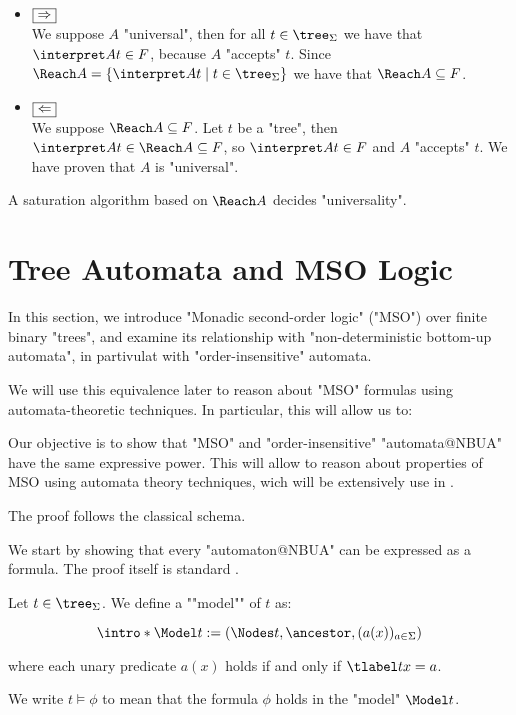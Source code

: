 \documentclass[a4paper,UKenglish,cleveref, autoref, thm-restate]{lipics-v2021}
\begin{document}
\begin{proofI}
	\begin{itemize}
		\item $\fbox{$\Rightarrow$}$\\
		      We suppose $A$ "universal", then for all $t \in \tree_\Sigma$ we have that $\interpret A t \in F$, because $A$ "accepts" $t$.
		      Since $\Reach A = \setdef {\interpret A t} {t\in \tree_\Sigma}$ we have that $\Reach A \subseteq F$.

		\item $\fbox{$\Leftarrow$}$\\
		      We suppose $\Reach A \subseteq F$. Let $t$ be a "tree", then $\interpret A t \in \Reach A \subseteq F$, so $\interpret A t \in F$ and $A$
		      "accepts" $t$. We have proven that $A$ is "universal".
	\end{itemize}
\end{proofI}


\begin{coro}\label{coro:univeral-Reach}
	A saturation algorithm based on $\Reach A$ decides "universality".
\end{coro}


\section{Tree Automata and MSO Logic}\label{sec:MSO}

In this section, we introduce "Monadic second-order logic" ("MSO") over finite binary "trees",
and examine its relationship with "non-deterministic bottom-up automata", in partivulat with "order-insensitive" automata.

We will use this equivalence later to reason about "MSO" formulas using automata-theoretic techniques. In particular, this will allow us to:

Our objective is to show that "MSO" and "order-insensitive" "automata@NBUA" have the same expressive power. This will allow to reason about
properties of MSO using automata theory techniques, wich will be extensively use in .

The proof follows the classical schema.

We start by showing that every "automaton@NBUA" can be expressed as a formula. The proof itself is standard \cite{Buchi60, Thomas1997, bookautomata}.

\begin{definition}
    \AP Let $t \in \tree_{\Sigma}$. We define a ""model"" of $t$ as:

	\[
		\intro* \Model t := (\Nodes t, \ancestor , (a (x))_{a \in \Sigma})
	\]

	where each unary predicate $a(x)$ holds if and only if $\tlabel t x = a$.

	We write $t \models \phi$ to mean that the formula $\phi$ holds in the "model" $\Model t$.
\end{definition}
\end{document}
